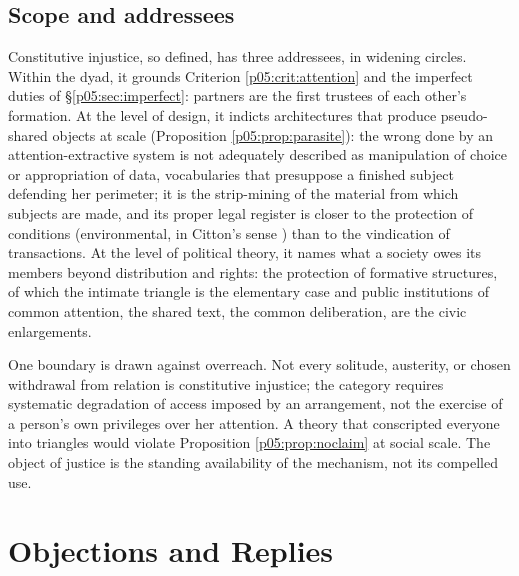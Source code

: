 \subsection{Scope and addressees}
\label{p05:sec:scope}

Constitutive injustice, so defined, has three addressees, in widening circles. Within the dyad, it grounds Criterion \ref{p05:crit:attention} and the imperfect duties of §\ref{p05:sec:imperfect}: partners are the first trustees of each other's formation. At the level of design, it indicts architectures that produce pseudo-shared objects at scale (Proposition \ref{p05:prop:parasite}): the wrong done by an attention-extractive system is not adequately described as manipulation of choice or appropriation of data, vocabularies that presuppose a finished subject defending her perimeter; it is the strip-mining of the material from which subjects are made, and its proper legal register is closer to the protection of conditions (environmental, in Citton's sense \parencite{citton2017}) than to the vindication of transactions. At the level of political theory, it names what a society owes its members beyond distribution and rights: the protection of formative structures, of which the intimate triangle is the elementary case and public institutions of common attention, the shared text, the common deliberation, are the civic enlargements.

One boundary is drawn against overreach. Not every solitude, austerity, or chosen withdrawal from relation is constitutive injustice; the category requires systematic degradation of access imposed by an arrangement, not the exercise of a person's own privileges over her attention. A theory that conscripted everyone into triangles would violate Proposition \ref{p05:prop:noclaim} at social scale. The object of justice is the standing availability of the mechanism, not its compelled use.

\section{Objections and Replies}
\label{p05:sec:objections}

